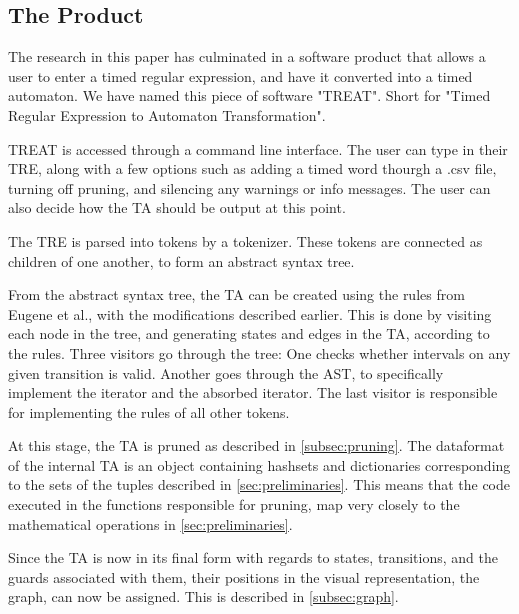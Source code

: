 \subsection{The Product}\label{subsec:theProduct}
The research in this paper has culminated in a software product that allows a user to enter a timed regular expression, and have it converted into a timed automaton.
We have named this piece of software "TREAT". Short for "Timed Regular Expression to Automaton Transformation".

TREAT is accessed through a command line interface. The user can type in their TRE, along with a few options such as adding a timed word thourgh a .csv file, turning off pruning, and silencing any warnings or info messages.
The user can also decide how the TA should be output at this point.

The TRE is parsed into tokens by a tokenizer. These tokens are connected as children of one another, to form an abstract syntax tree. 

From the abstract syntax tree, the TA can be created using the rules from Eugene et al., with the modifications described earlier. %
This is done by visiting each node in the tree, and generating states and edges in the TA, according to the rules. Three visitors go through the tree: One checks whether intervals on any given transition is valid. Another goes through the AST, to specifically implement the iterator and the absorbed iterator. The last visitor is responsible for implementing the rules of all other tokens.

At this stage, the TA is pruned as described in \cref{subsec:pruning}. 
The dataformat of the internal TA is an object containing hashsets and dictionaries corresponding to the sets of the tuples described in \cref{sec:preliminaries}. 
This means that the code executed in the functions responsible for pruning, map very closely to the mathematical operations in \cref{sec:preliminaries}.

Since the TA is now in its final form with regards to states, transitions, and the guards associated with them, their positions in the visual representation, the graph, can now be assigned. This is described in \cref{subsec:graph}.








